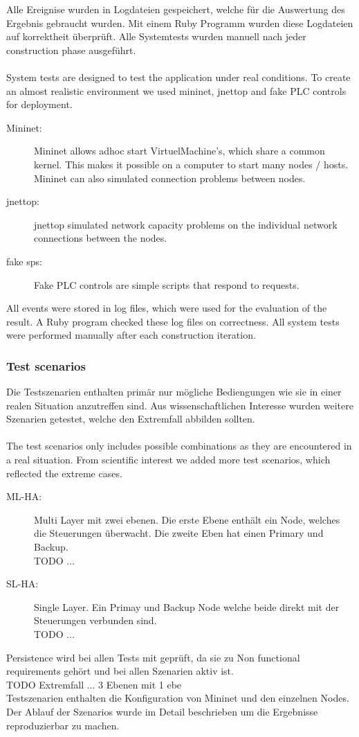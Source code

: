 Alle Ereignise wurden in Logdateien gespeichert, welche für die Auswertung des Ergebnis gebraucht wurden. 
Mit einem Ruby Programm wurden diese Logdateien auf korrektheit überprüft.
Alle Systemtests wurden manuell nach jeder construction phase ausgeführt.\\
\\
System tests are designed to test the application under real conditions. 
To create an almost realistic environment we used mininet, jnettop and fake \gls{PLC} controls for deployment.
\begin{description}
	\item [Mininet:]
		Mininet allows adhoc start VirtuelMachine's, which share a common kernel.
		This makes it possible on a computer to start many nodes / hosts. 
		Mininet can also simulated connection problems between nodes.
	\item [jnettop:]
		jnettop simulated network capacity problems on the individual network connections between the nodes.
	\item [fake sps:]
		Fake \gls{PLC} controls are simple scripts that respond to requests.
\end{description}

All events were stored in log files, which were used for the evaluation of the result. 
A Ruby program checked these log files on correctness. All system tests were performed manually 
after each construction iteration.

\subsubsection{Test scenarios}
Die Testszenarien enthalten primär nur mögliche Bediengungen wie sie in einer realen Situation anzutreffen sind. Aus wissenschaftlichen Interesse wurden weitere Szenarien
getestet, welche den Extremfall abbilden sollten.\\
\\
The test scenarios only includes possible combinations as they are encountered in a real situation. From scientific interest
we added more test scenarios, which reflected the extreme cases.
\begin{description}
	\item [ML-HA:]
		Multi Layer mit zwei ebenen. Die erste Ebene enthält ein Node, 
		welches die Steuerungen überwacht. Die zweite Eben hat einen Primary und Backup.
	\\TODO ...
	\item [SL-HA:]
		Single Layer. Ein Primay und Backup Node welche beide direkt mit der Steuerungen verbunden sind.
		\\TODO ...
\end{description}
Persistence wird bei allen Tests mit geprüft, da sie zu Non functional requirements gehört und bei allen Szenarien aktiv ist.
\\TODO Extremfall ... 3 Ebenen mit 1 ebe
\\
Testszenarien enthalten die Konfiguration von Mininet und den einzelnen Nodes. 
Der Ablauf der Szenarios wurde im Detail beschrieben um die Ergebnisse reproduzierbar zu machen.


